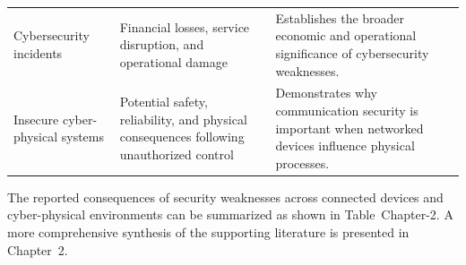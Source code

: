 \begin{table}[htbp]
\begin{tabular}{p{3.2cm} p{5.2cm} p{5.2cm}}
    Cybersecurity incidents                                                                                &
    Financial losses, service disruption, and operational damage                                           &
    Establishes the broader economic and operational significance of cybersecurity weaknesses.                                                                                             \\

    Insecure cyber-physical systems                                                                        &
    Potential safety, reliability, and physical consequences following unauthorized control                &
    Demonstrates why communication security is important when networked devices influence physical processes.                                                                              \\

    \hline
  \end{tabular}
\end{table}

The reported consequences of security weaknesses across connected devices and cyber-physical environments can be summarized as shown in Table~Chapter-2. A more comprehensive synthesis of the supporting literature is presented in Chapter~2.

